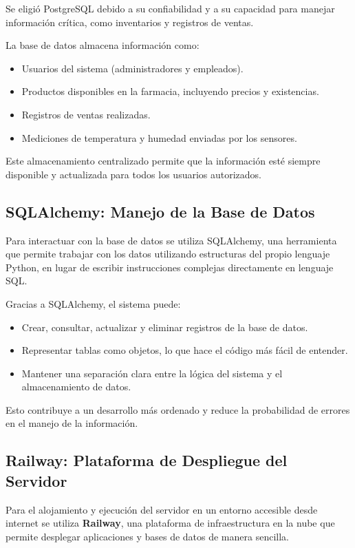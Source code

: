 Se eligió PostgreSQL debido a su confiabilidad y a su capacidad para manejar información crítica, como inventarios y registros de ventas.

La base de datos almacena información como:

\begin{itemize}
    \item Usuarios del sistema (administradores y empleados).
    \item Productos disponibles en la farmacia, incluyendo precios y existencias.
    \item Registros de ventas realizadas.
    \item Mediciones de temperatura y humedad enviadas por los sensores.
\end{itemize}

Este almacenamiento centralizado permite que la información esté siempre disponible y actualizada para todos los usuarios autorizados.

\subsection{SQLAlchemy: Manejo de la Base de Datos}

Para interactuar con la base de datos se utiliza SQLAlchemy, una herramienta que permite trabajar con los datos utilizando estructuras del propio lenguaje Python, en lugar de escribir instrucciones complejas directamente en lenguaje SQL.

Gracias a SQLAlchemy, el sistema puede:

\begin{itemize}
    \item Crear, consultar, actualizar y eliminar registros de la base de datos.
    \item Representar tablas como objetos, lo que hace el código más fácil de entender.
    \item Mantener una separación clara entre la lógica del sistema y el almacenamiento de datos.
\end{itemize}

Esto contribuye a un desarrollo más ordenado y reduce la probabilidad de errores en el manejo de la información.

\subsection{Railway: Plataforma de Despliegue del Servidor}

Para el alojamiento y ejecución del servidor en un entorno accesible desde internet se utiliza \textbf{Railway}, una plataforma de infraestructura en la nube que permite desplegar aplicaciones y bases de datos de manera sencilla.

